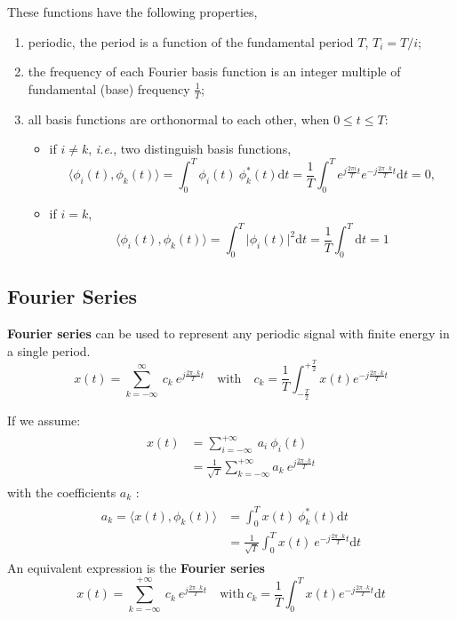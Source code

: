 These functions have the following properties,
\begin{enumerate}
    \item periodic, the period is a function of the fundamental period $T$, $T_i= T/i$;
    \item the frequency of each Fourier basis function is an integer multiple of fundamental (base) frequency $\frac{1}{T}$;
    \item all basis functions are orthonormal to each other, when $0 \leq t \leq T$:
    \begin{itemize}
        \item if $i \neq k$, \textit{i.e.}, two distinguish basis functions,
        \[
            \langle \phi_{i}(t), \phi_{k}(t) \rangle = \int_{0}^{T}  \phi_{i}(t) \ \phi_{k}^{*}(t) \mathrm{d}t = \frac{1}{T} \int_{0}^{T} e^{j\frac{2\pi i}{T} t}e^{-j\frac{2\pi\cdot k}{T} t} \mathrm{d}t = 0,
        \]
        \item if $i=k$,
        \[
            \langle \phi_{i}(t), \phi_{k}(t) \rangle = \int_{0}^{T} \lvert \phi_{i}(t) \rvert^{2}\mathrm{d}t = \frac{1}{T} \int_{0}^{T}\mathrm{d}t =1
        \]
    \end{itemize}
\end{enumerate}

\subsection{Fourier Series}
\textbf{Fourier series} can be used to represent any periodic signal with finite energy in a single period. 
\[
    x(t) =  \sum_{k=-\infty}^{\infty} \ c_{k} \ e^{j\frac{2\pi\cdot k}{T}t} \quad \text{with} \quad c_{k} = \frac{1}{T} \int_{-\frac{T}{2}}^{+\frac{T}{2}} x(t)e^{-j\frac{2\pi\cdot k}{T}t}
\]

\begin{dv}{}
    If we assume:
    \begin{align*}
    \begin{split}
        x(t) 
        &= \sum_{i=-\infty}^{+\infty} \ a_{i} \ \phi_{i}(t) \\
        &= \frac{1}{\sqrt{T}} \sum_{k=-\infty}^{+\infty} a_{k} \ e^{j\frac{2\pi\cdot k}{T}t}
    \end{split} 
    \end{align*}
    with the coefficients $a_{k}$ :
    \begin{align*}
    \begin{split}
        a_{k} = \langle x(t), \phi_{k}(t) \rangle 
        &= \int_{0}^{T} x(t)\ \phi_{k}^{*}(t)\mathrm{d}t \\
        &= \frac{1}{\sqrt{T}} \int_{0}^{T} x(t)\ e^{-j\frac{2\pi\cdot k}{T}t} \mathrm{d}t 
    \end{split}
    \end{align*}
    An equivalent expression is the \textbf{Fourier series}
    \[
        x(t) 
        = \sum_{k=-\infty}^{+\infty} \ c_{k} \ e^{j\frac{2\pi\cdot k}{T}t} 
        \quad \text{with} \ 
        c_{k} = \frac{1}{T} \int_{0}^{T} x(t)e^{-j\frac{2\pi\cdot k}{T}t} \mathrm{d}t
    \]
\end{dv}

